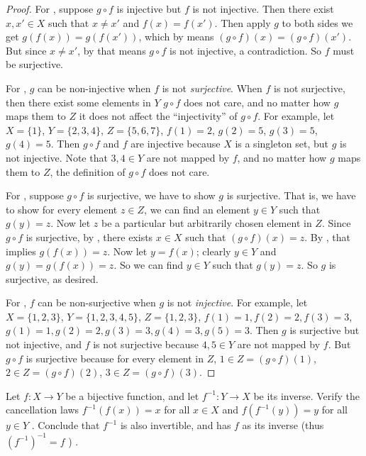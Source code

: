 \begin{proof}
For , suppose \(g \circ f\) is injective but \(f\) is not injective.
Then there exist \(x, x' \in X\) such that \(x \neq x'\) and \(f(x) = f(x')\).
Then apply \(g\) to both sides we get \(g(f(x)) = g(f(x'))\), which by  means \((g \circ f)(x) = (g \circ f)(x')\).
But since \(x \neq x'\), by  that means \(g \circ f\) is not injective, a contradiction.
So \(f\) must be surjective.

For , \(g\) can be non-injective when \(f\) is not \emph{surjective}. When \(f\) is not surjective, then there exist some elements in \(Y\) \(g \circ f\) does not care, and no matter how \(g\) maps them to \(Z\) it does not affect the ``injectivity'' of \(g \circ f\).
For example,
let \(X = \{1\}\), \(Y = \{2, 3, 4\}\), \(Z = \{5, 6, 7\}\), 
\(f(1) = 2\),
\(g(2) = 5\), \(g(3) = 5\), \(g(4) = 5\).
Then \(g \circ f\) and \(f\) are injective because \(X\) is a singleton set, but \(g\) is not injective.
Note that \(3, 4 \in Y\) are not mapped by \(f\), and no matter how \(g\) maps them to \(Z\), the definition of \(g \circ f\) does not care.

For , suppose \(g \circ f\) is surjective, we have to show \(g\) is surjective.
That is, we have to show for every element \(z \in Z\), we can find an element \(y \in Y\) such that \(g(y) = z\).
Now let \(z\) be a particular but arbitrarily chosen element in \(Z\).
Since \(g \circ f\) is surjective, by , there exists \(x \in X\) such that \((g \circ f)(x) = z\).
By , that implies \(g(f(x)) = z\).
Now let \(y = f(x)\); clearly \(y \in Y\) and \(g(y) = g(f(x)) = z\).
So we can find \(y \in Y\) such that \(g(y) = z\).
So \(g\) is surjective, as desired.

For , \(f\) can be non-surjective when \(g\) is not \emph{injective}.
For example,
let \(X = \{ 1, 2, 3 \}\), \(Y = \{ 1, 2, 3, 4, 5 \}\), \(Z = \{ 1, 2, 3 \}\),
\(f(1) = 1, f(2) = 2, f(3) = 3\),
\(g(1) = 1, g(2) = 2, g(3) = 3, g(4) = 3, g(5) = 3\).
Then \(g\) is surjective but not injective, and \(f\) is not surjective because \(4, 5 \in Y\) are not mapped by \(f\).
But \(g \circ f\) is surjective because for every element in \(Z\),
\(1 \in Z = (g \circ f)(1)\),
\(2 \in Z = (g \circ f)(2)\),
\(3 \in Z = (g \circ f)(3)\).
\end{proof}

\begin{exercise} \label{exercise 3.3.6}
Let \(f : X \rightarrow Y\) be a bijective function, and let \(f^{-1} : Y \rightarrow X\) be its inverse.
Verify the cancellation laws \(f^{-1}(f(x)) = x\) for all \(x \in X\)  and \(f(f^{-1}(y)) = y\) for all \(y \in Y\) .
Conclude that \(f^{-1}\) is also invertible,  and has \(f\) as its inverse (thus \( (f^{-1})^{-1} = f \) ) .
\end{exercise}

